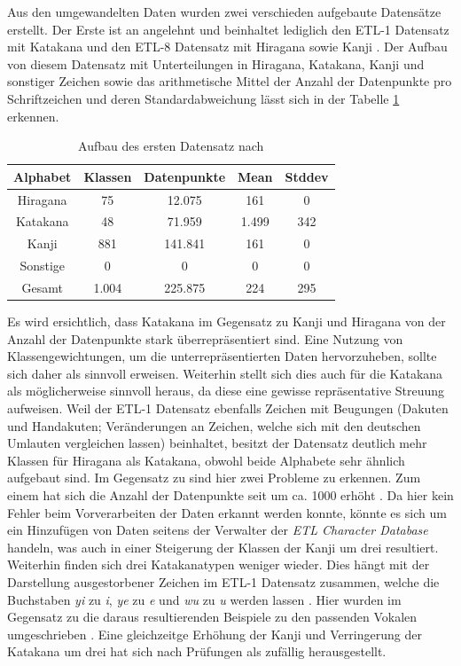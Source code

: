 \documentclass[twoside,a4paper]{IEEEtran}
\begin{document}
Aus den umgewandelten Daten wurden zwei verschieden aufgebaute Datensätze erstellt. Der Erste ist an \cite{RHC} angelehnt und beinhaltet lediglich den ETL-1 Datensatz mit Katakana und den ETL-8 Datensatz mit Hiragana sowie Kanji \cite[S.3]{RHC}. Der Aufbau von diesem Datensatz mit Unterteilungen in Hiragana, Katakana, Kanji und sonstiger Zeichen sowie das arithmetische Mittel der Anzahl der Datenpunkte pro Schriftzeichen und deren Standardabweichung lässt sich in der Tabelle \ref{data_tsai} erkennen.
\begin{table}[!htb]
	\caption{Aufbau des ersten Datensatz nach \cite{RHC}}
	\label{data_tsai}
	\centering
	\begin{tabular}{|c|c|c|c|c|}
		\hline
		Alphabet & Klassen & Datenpunkte & Mean & Stddev\\
		\hline
		\hline
		Hiragana & 75 & 12.075 & 161 & 0\\
		\hline 
		Katakana & 48 & 71.959 & 1.499 & 342\\
		\hline
		Kanji & 881 & 141.841 & 161 & 0\\
		\hline
		Sonstige & 0 & 0 & 0 & 0\\
		\hline
		\hline
		Gesamt & 1.004 & 225.875 & 224 & 295\\
		\hline
	\end{tabular}
\end{table}

Es wird ersichtlich, dass Katakana im Gegensatz zu Kanji und Hiragana von der Anzahl der Datenpunkte stark überrepräsentiert sind. Eine Nutzung von Klassengewichtungen, um die unterrepräsentierten Daten hervorzuheben, sollte sich daher als sinnvoll erweisen. Weiterhin stellt sich dies auch für die Katakana als möglicherweise sinnvoll heraus, da diese eine gewisse repräsentative Streuung aufweisen. Weil der ETL-1 Datensatz ebenfalls Zeichen mit Beugungen (Da\-ku\-ten und Han\-da\-ku\-ten; Veränderungen an Zeichen, welche sich mit den deutschen Umlauten vergleichen lassen) beinhaltet, besitzt der Datensatz deutlich mehr Klassen für Hiragana als Katakana, obwohl beide Alphabete sehr ähnlich aufgebaut sind. Im Gegensatz zu \cite{RHC} sind hier zwei Probleme zu erkennen. Zum einem hat sich die Anzahl der Datenpunkte seit \cite{RHC} um ca. 1000 erhöht \cite[S.3]{RHC}. Da hier kein Fehler beim Vorverarbeiten der Daten erkannt werden konnte, könnte es sich um ein Hinzufügen von Daten seitens der Verwalter der \emph{ETL Character Database} handeln, was auch in einer Steigerung der Klassen der Kanji um drei resultiert. Weiterhin finden sich drei Katakanatypen weniger wieder. Dies hängt mit der Darstellung ausgestorbener Zeichen im ETL-1 Datensatz zusammen, welche die Buchstaben \textit{yi} zu \textit{i}, \textit{ye} zu \textit{e} und \textit{wu} zu \textit{u} werden lassen \cite{ETL}. Hier wurden im Gegensatz zu \cite{RHC} die daraus resultierenden Beispiele zu den passenden Vokalen umgeschrieben \cite[S.3]{RHC}. Eine gleichzeitge Erhöhung der Kanji und Verringerung der Katakana um drei hat sich nach Prüfungen als zufällig herausgestellt. 
\end{document}
